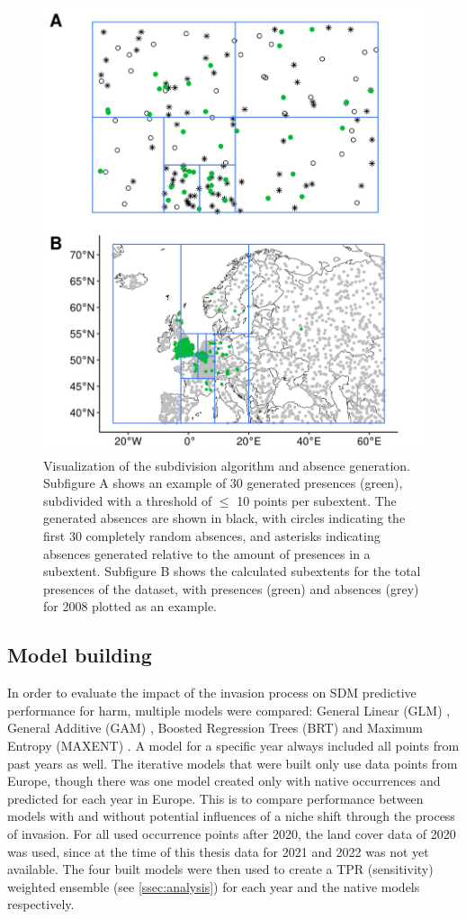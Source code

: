 \documentclass[12pt,a4paper]{article}
\begin{document}
\begin{figure}[!h]
    \centering
    \includegraphics[width = 0.8\linewidth]{"../../R/figures/ext-subdiv.png"}
    \caption{\label{fig:ext_subdiv} Visualization of the subdivision algorithm and absence generation. Subfigure A shows an example of 30 generated presences (green), subdivided with a threshold of $\leq$ 10 points per subextent. The generated absences are shown in black, with circles indicating the first 30 completely random absences, and asterisks indicating absences generated relative to the amount of presences in a subextent. Subfigure B shows the calculated subextents for the total presences of the dataset, with presences (green) and absences (grey) for 2008 plotted as an example.}
\end{figure}

\subsection{Model building} \label{ssec:modelbuilding}

In order to evaluate the impact of the invasion process on SDM predictive performance for \gls{harm}, multiple models were compared: General Linear (GLM) \autocite{guisan2002glm-gam}, General Additive (GAM) \autocite{guisan2002glm-gam}, Boosted Regression Trees (BRT) \autocite{elith2008brt} and Maximum Entropy (MAXENT) \autocite{phillips2017maxnet}.
A model for a specific year always included all points from past years as well.
The iterative models that were built only use data points from Europe, though there was one model created only with native occurrences and predicted for each year in Europe.
This is to compare performance between models with and without potential influences of a niche shift through the process of invasion.
For all used occurrence points after 2020, the land cover data of 2020 was used, since at the time of this thesis data for 2021 and 2022 was not yet available.
The four built models were then used to create a TPR (sensitivity) weighted ensemble (see \ref{ssec:analysis}) for each year and the native models respectively.
\end{document}
